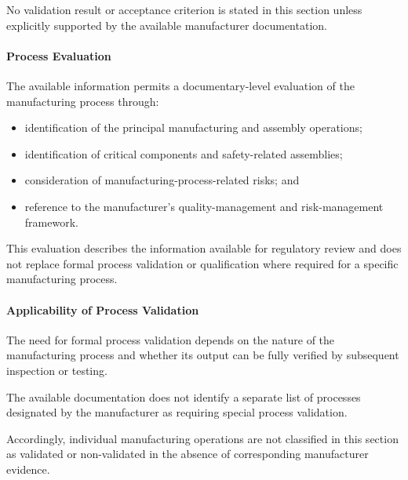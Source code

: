 No validation result or acceptance criterion is stated in this
section unless explicitly supported by the available manufacturer
documentation.


\paragraph{Process Evaluation}

The available information permits a documentary-level evaluation
of the manufacturing process through:

\begin{itemize}
    \item identification of the principal manufacturing and
    assembly operations;
    \item identification of critical components and safety-related
    assemblies;
    \item consideration of manufacturing-process-related risks; and
    \item reference to the manufacturer's quality-management and
    risk-management framework.
\end{itemize}

This evaluation describes the information available for regulatory
review and does not replace formal process validation or
qualification where required for a specific manufacturing process.


\paragraph{Applicability of Process Validation}

The need for formal process validation depends on the nature of
the manufacturing process and whether its output can be fully
verified by subsequent inspection or testing.

The available documentation does not identify a separate list of
processes designated by the manufacturer as requiring special
process validation.

Accordingly, individual manufacturing operations are not classified
in this section as validated or non-validated in the absence of
corresponding manufacturer evidence.

